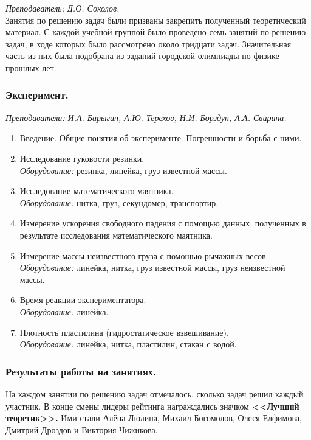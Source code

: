 \documentclass[12pt]{article}
\newlength{\h}
\newlength{\x}
\begin{document}
\textit{Преподаватель: Д.О. Соколов. }\\

Занятия по решению задач были призваны закрепить полученный
теоретический материал. С каждой учебной группой было проведено семь
занятий по решению задач, в ходе которых было рассмотрено около
тридцати задач. Значительная часть из них была подобрана из заданий
городской олимпиады по физике прошлых лет. 

\subsubsection{Эксперимент.}
\label{sec:daily8exp}

\textit{Преподаватели: И.А. Барыгин, А.Ю. Терехов, Н.И. Борздун, А.А. Свирина.}\\

\begin{enumerate}
\item Введение. Общие понятия об эксперименте. Погрешности и борьба с
  ними.
\item Исследование гуковости резинки. \\
  \textit{Оборудование:} резинка, линейка, груз известной массы.
\item Исследование математического маятника. \\
  \textit{Оборудование:} нитка, груз, секундомер, транспортир.
\item Измерение ускорения свободного падения с помощью данных,
  полученных в результате исследования математического маятника.
\item Измерение массы неизвестного груза с помощью рычажных весов. \\
  \textit{Оборудование:} линейка, нитка, груз известной массы,
  груз неизвестной массы. 
\item Время реакции экспериментатора. \\
  \textit{Оборудование:} линейка.
\item Плотность пластилина (гидростатическое взвешивание). \\
  \textit{Оборудование:} линейка, нитка, пластилин, стакан с водой. 
\end{enumerate}

\subsubsection{Результаты работы на занятиях. }
\label{sec:daily8res}

На каждом занятии по решению задач отмечалось, сколько задач решил
каждый участник. В конце смены лидеры рейтинга награждались значком
\textbf{<<Лучший теоретик>>.} Ими стали Алёна Люлина, Михаил
Богомолов, Олеся Елфимова, Дмитрий Дроздов и Виктория Чижикова. 
\end{document}
